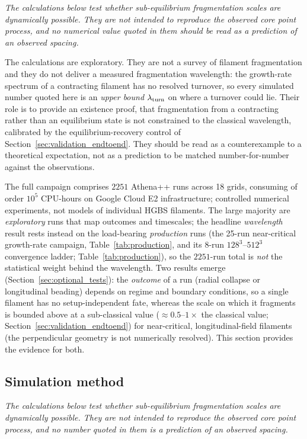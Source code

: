 \documentclass[usenatbib,twoside,twocolumn]{mnras}
\begin{document}
\smallskip\noindent\emph{The calculations below test whether sub-equilibrium fragmentation scales are dynamically possible. They are not intended to reproduce the observed core point process, and no numerical value quoted in them should be read as a prediction of an observed spacing.}

\noindent The calculations are exploratory. They are not a survey of filament fragmentation and they do not deliver a measured fragmentation wavelength: the growth-rate spectrum of a contracting filament has no resolved turnover, so every simulated number quoted here is an \emph{upper bound} $\lambda_{\rm turn}$ on where a turnover could lie. Their role is to provide an existence proof, that fragmentation from a contracting rather than an equilibrium state is not constrained to the classical wavelength, calibrated by the equilibrium-recovery control of Section~\ref{sec:validation_endtoend}. They should be read as a counterexample to a theoretical expectation, not as a prediction to be matched number-for-number against the observations.

The full campaign comprises $2251$ Athena++ runs across 18 grids, consuming of order $10^5$ CPU-hours on Google Cloud E2 infrastructure; controlled numerical experiments, not models of individual HGBS filaments. The large majority are \emph{exploratory} runs that map outcomes and timescales; the headline \emph{wavelength} result rests instead on the load-bearing \emph{production} runs (the 25-run near-critical growth-rate campaign, Table~\ref{tab:production}, and its 8-run $128^3$--$512^3$ convergence ladder; Table~\ref{tab:production}), so the $2251$-run total is \emph{not} the statistical weight behind the wavelength. Two results emerge (Section~\ref{sec:optional_tests}): the \emph{outcome} of a run (radial collapse or longitudinal beading) depends on regime and boundary conditions, so a single filament has no setup-independent fate, whereas the scale on which it fragments is bounded above at a sub-classical value ($\approx0.5$--$1\times$ the classical value; Section~\ref{sec:validation_endtoend}) for near-critical, longitudinal-field filaments (the perpendicular geometry is not numerically resolved). This section provides the evidence for both.

\subsection{Simulation method}
\label{sec:simmethod}

\smallskip\noindent\emph{The calculations below test whether sub-equilibrium fragmentation scales are dynamically possible. They are not intended to reproduce the observed core point process, and no number quoted in them is a prediction of an observed spacing.}
\end{document}
